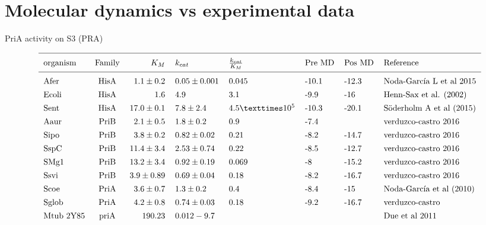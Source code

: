 \documentclass[12pt,twoside]{reedthesis}
\begin{document}
  \section{Molecular dynamics vs experimental
  data}\label{molecular-dynamics-vs-experimental-data}
  
  PriA activity on S3 (PRA)
  
  \[ 
  \begin{tabular}{ l c r l l l l l}
  \hline \\ [-1.5ex]
  organism  &Family & $K_M    $     & $k_{cat}$        & $\frac{k_{cat}}{K_M}$ &Pre MD & Pos MD & Reference  \\ [1ex]
  \hline \\ [-1.5ex]
  Afer        &HisA   & $1.1\pm0.2$   &$  0.05\pm0.001    $& 0.045                  &-10.1    &-12.3       &Noda-García L et al 2015\\ [1ex]
  Ecoli       &HisA   &$  1.6         $&$         4.9       $&3.1                   &-9.9   &-16       &Henn-Sax et al. (2002)\\ [1ex]
  Sent        &HisA   &$  17.0 \pm0.1 $&$ 7.8 \pm 2.4   $&$4.5 × 10^5          $&-10.3  &-20.1     &Söderholm A et al (2015)\\ [1ex]
  Aaur        &PriB   &$  2.1 \pm 0.5 $& $    1.8 \pm 0.2     $&0.9                   &-7.4   &              &verduzco-castro 2016\\ [1ex]
  Sipo        &PriB   &$  3.8\pm0.2     $&$0.82\pm0.02        $&0.21                  &-8.2     &-14.7       &verduzco-castro 2016\\ [1ex]
  SspC        &PriB   &$  11.4\pm3.4  $&$2.53\pm0.74      $&0.22                  &   -8.5    &-12.7     &verduzco-castro 2016\\ [1ex]
  SMg1        &PriB   &$  13.2\pm3.4  $&$0.92\pm0.19      $&0.069                 &-8     &-15.2     &verduzco-castro 2016\\ [1ex]
  Ssvi        &PriB   &$  3.9\pm0.89  $&$0.69\pm0.04      $&0.18                  &-8.2     &-16.7     &verduzco-castro 2016\\ [1ex]
  Scoe        &PriA   &$  3.6\pm0.7     $&$ 1.3\pm0.2     $  &0.4                   &-8.4   &-15       &Noda-García et al (2010)\\ [1ex]
  Sglob       &PriA   & $4.2\pm0.8     $ & $0.74\pm0.03    $   &0.18                  &-9.2     &-16.7       &verduzco-castro\\ [1ex]
  Mtub 2Y85   &priA   &$  19  0.23      $&$0.012  -9.7          $&                      &       &          &Due et al 2011\\ [1ex]

\end{tabular}\]
\end{document}
